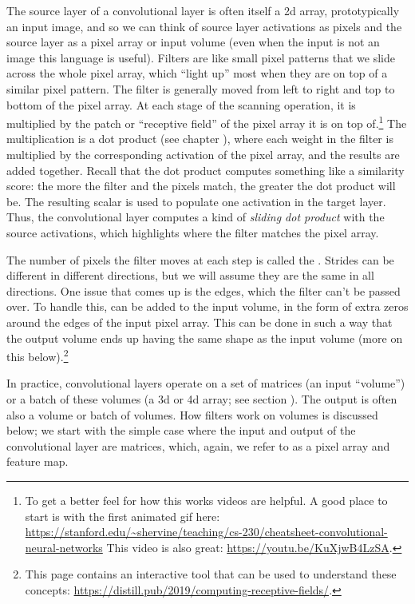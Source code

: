  The source layer of a convolutional layer is often itself a 2d array, prototypically an input image, and so we can think of source layer activations as pixels and the source layer as a pixel array or input volume (even when the input is not an image this language is useful). Filters are like small pixel patterns that we slide across the whole pixel array, which ``light up'' most when they are on top of a similar pixel pattern. The filter is generally moved from left to right and top to bottom of the pixel array. At each stage of the scanning operation, it is multiplied by the patch or ``receptive field''  of the pixel array it is on top of.\footnote{To get a better feel for how this works videos are helpful. A good place  to start is with the first animated gif here: \url{https://stanford.edu/~shervine/teaching/cs-230/cheatsheet-convolutional-neural-networks} This video is also great: \url{https://youtu.be/KuXjwB4LzSA}.} The multiplication is a dot product (see chapter ), where each weight in the filter is multiplied by the corresponding activation of the pixel array, and the results are added together. Recall that the dot product computes something like a similarity score: the more the filter and the pixels match, the greater the dot product will be. The resulting scalar is used to populate one activation in the target layer. Thus, the convolutional layer computes a kind of \emph{sliding dot product} with the source activations, which highlights where the filter matches the pixel array.
 
 The number of pixels the filter moves at each step is called the . Strides can be different in different directions, but we will assume they are the same in all directions. One issue that comes up is the edges, which the filter can't be passed over. To handle this,  can be added to the input volume, in the form of extra zeros around the edges of the input pixel array. This can be done in such a way that the output volume ends up having the same shape as the input volume (more on this below).\footnote{This page contains an interactive tool that can be used to understand these concepts: \url{https://distill.pub/2019/computing-receptive-fields/}.}

In practice, convolutional layers operate on a set of matrices  (an input ``volume'') or a batch of these volumes (a 3d or 4d array; see section ). The output is often also a volume or batch of volumes. How filters work on volumes is discussed below; we start with the simple case where the input and output of the convolutional layer are matrices, which, again, we refer to as a pixel array and feature map.

